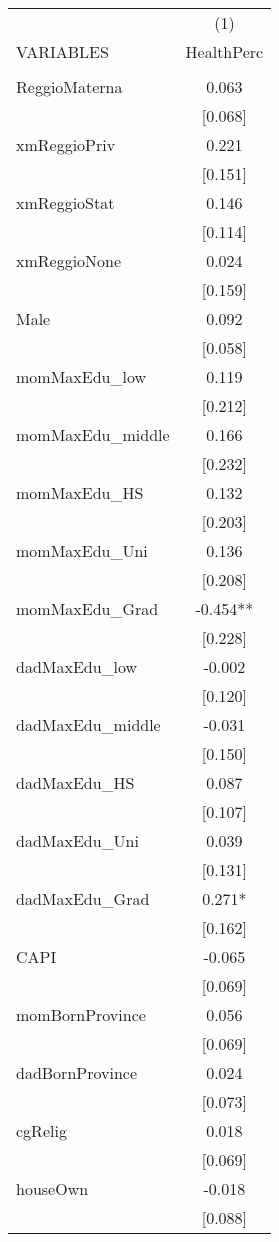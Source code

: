 \documentclass[]{article}
\begin{document}
\begin{tabular}{lc} \hline
 & (1) \\
VARIABLES & HealthPerc \\ \hline
 &  \\
ReggioMaterna & 0.063 \\
 & [0.068] \\
xmReggioPriv & 0.221 \\
 & [0.151] \\
xmReggioStat & 0.146 \\
 & [0.114] \\
xmReggioNone & 0.024 \\
 & [0.159] \\
Male & 0.092 \\
 & [0.058] \\
momMaxEdu\_low & 0.119 \\
 & [0.212] \\
momMaxEdu\_middle & 0.166 \\
 & [0.232] \\
momMaxEdu\_HS & 0.132 \\
 & [0.203] \\
momMaxEdu\_Uni & 0.136 \\
 & [0.208] \\
momMaxEdu\_Grad & -0.454** \\
 & [0.228] \\
dadMaxEdu\_low & -0.002 \\
 & [0.120] \\
dadMaxEdu\_middle & -0.031 \\
 & [0.150] \\
dadMaxEdu\_HS & 0.087 \\
 & [0.107] \\
dadMaxEdu\_Uni & 0.039 \\
 & [0.131] \\
dadMaxEdu\_Grad & 0.271* \\
 & [0.162] \\
CAPI & -0.065 \\
 & [0.069] \\
momBornProvince & 0.056 \\
 & [0.069] \\
dadBornProvince & 0.024 \\
 & [0.073] \\
cgRelig & 0.018 \\
 & [0.069] \\
houseOwn & -0.018 \\
 & [0.088] \\

\end{tabular}
\end{document}
